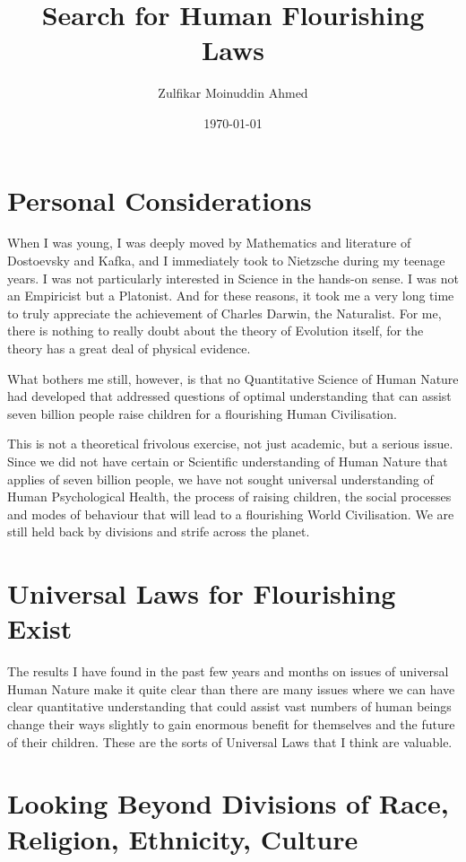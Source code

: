 \documentclass{amsart}
\title{Search for Human Flourishing Laws}
\author{Zulfikar Moinuddin Ahmed}
\date{\today}
\begin{document}
\maketitle

\section{Personal Considerations}

When I was young, I was deeply moved by Mathematics and literature of Dostoevsky and Kafka, and I immediately took to Nietzsche during my teenage years.  I was not particularly interested in Science in the hands-on sense.  I was not an Empiricist but a Platonist.  And for these reasons, it took me a very long time to truly appreciate the achievement of Charles Darwin, the Naturalist. For me, there is nothing to really doubt about the theory of Evolution itself, for the theory has a great deal of physical evidence.  

What bothers me still, however, is that no Quantitative Science of Human Nature had developed that addressed questions of optimal understanding that can assist seven billion people raise children for a flourishing Human Civilisation.  

This is not a theoretical frivolous exercise, not just academic, but a serious issue.  Since we did not have certain or Scientific understanding of Human Nature that applies of seven billion people, we have not sought universal understanding of Human Psychological Health, the process of raising children, the social processes and modes of behaviour that will lead to a flourishing World Civilisation.  We are still held back by divisions and strife across the planet.  

\section{Universal Laws for Flourishing Exist}

The results I have found in the past few years and months on issues of universal Human Nature make it quite clear than there are many issues where we can have clear quantitative understanding that could assist vast numbers of human beings change their ways slightly to gain enormous benefit for themselves and the future of their children.  These are the sorts of Universal Laws that I think are valuable.  

\section{Looking Beyond Divisions of Race, Religion, Ethnicity, Culture}
\end{document}
